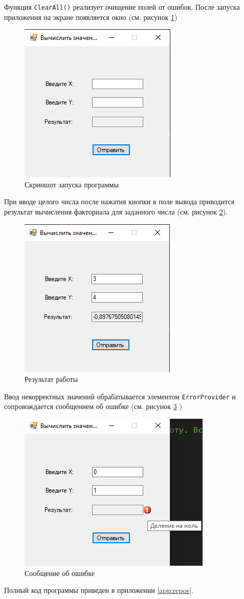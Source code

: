 Функция \verb|ClearAll()| реализует очищение полей от ошибок.
После запуска приложения на экране появляется окно (см. рисунок \ref{fig:exec2})
\begin{figure}[H]
    \centering
    \includegraphics{task2/exec.png}
    \caption{Скриншот запуска программы}
    \label{fig:exec2}
\end{figure}
При вводе целого числа после нажатия кнопки в поле вывода приводится
результат вычисления факториала для заданного числа (см. рисунок \ref{fig:result2}).
\begin{figure}[H]
    \centering
    \includegraphics{task2/result.png}
    \caption{Результат работы}
    \label{fig:result2}
\end{figure}
Ввод некорректных значений обрабатывается элементом \verb|ErrorProvider| и 
сопровождается сообщением об ошибке (см. рисунок \ref{fig:error2} )
\begin{figure}[H]
    \centering
    \includegraphics{task2/error.png}
    \caption{Сообщение об ошибке}
    \label{fig:error2}
\end{figure}
Полный код программы приведен в приложении \ref{app:repos}.